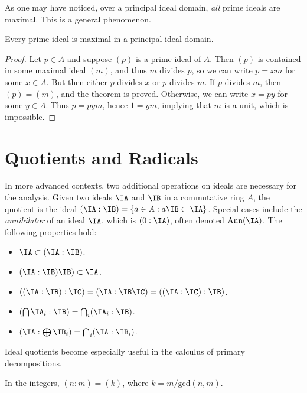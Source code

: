 As one may have noticed, over a principal ideal domain, \emph{all} prime ideals are maximal. This is a general phenomenon.

\begin{theorem}
    Every prime ideal is maximal in a principal ideal domain.
\end{theorem}
\begin{proof}
    Let $p \in A$ and suppose $(p)$ is a prime ideal of $A$. Then $(p)$ is contained in some maximal ideal $(m)$, and thus $m$ divides $p$, so we can write $p = xm$ for some $x \in A$. But then either $p$ divides $x$ or $p$ divides $m$. If $p$ divides $m$, then $(p) = (m)$, and the theorem is proved. Otherwise, we can write $x = py$ for some $y \in A$. Thus $p = pym$, hence $1 = ym$, implying that $m$ is a unit, which is impossible.
\end{proof}

\section{Quotients and Radicals}

In more advanced contexts, two additional operations on ideals are necessary for the analysis. Given two ideals $\IA$ and $\IB$ in a commutative ring $A$, the quotient is the ideal $(\IA: \IB) = \{ a \in A : a \IB \subset \IA \}$. Special cases include the \emph{annihilator} of an ideal $\IA$, which is $(0: \IA)$, often denoted $\text{Ann}(\IA)$. The following properties hold:
%
\begin{itemize}
    \item $\IA \subset (\IA : \IB)$.
    \item $(\IA: \IB) \IB) \subset \IA$.
    \item $((\IA:\IB):\IC) = (\IA: \IB \IC) = ((\IA:\IC):\IB)$.
    \item $(\bigcap \IA_i: \IB) = \bigcap_i (\IA_i: \IB)$.
    \item $(\IA: \bigoplus \IB_i) = \bigcap_i (\IA: \IB_i)$.
\end{itemize}
%
Ideal quotients become especially useful in the calculus of primary decompositions.

\begin{example}
    In the integers, $(n:m) = (k)$, where $k = m / \text{gcd}(n,m)$.
\end{example}

